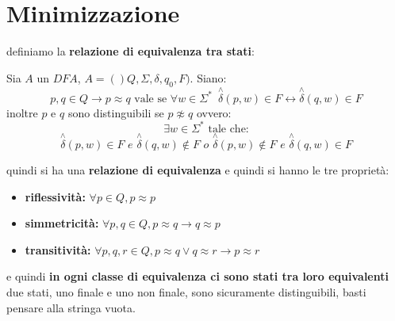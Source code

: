 \section{Minimizzazione}
definiamo la \textbf{relazione di equivalenza tra stati}:
\begin{definition}
	Sia $A$ un $DFA$, $A=()Q,\Sigma,\delta,q_0,F)$. Siano:
	$$p,q\in Q\to p\approx q\mbox{ vale se } \forall w \in \Sigma^*\,\,\, \stackrel{\wedge}{\delta}(p,w)\in F\longleftrightarrow \stackrel{\wedge}{\delta}(q,w)\in F$$
	inoltre $p$ e $q$ sono distinguibili se $p\not\approx q$ ovvero:
	$$\exists w\in \Sigma^*\mbox{ tale che:} $$
	$$\stackrel{\wedge}{\delta}(p,w)\in F \,\,e\,\,\stackrel{\wedge}{\delta}(q,w)\not\in F\,\,o\,\,\stackrel{\wedge}{\delta}(p,w)\not\in F \,\,e\,\,\stackrel{\wedge}{\delta}(q,w)\in F$$
\end{definition}
quindi si ha una \textbf{relazione di equivalenza} e quindi si hanno le tre proprietà:
\begin{itemize}
	\item \textbf{riflessività:} $\forall p\in Q, p\approx p$
	\item \textbf{simmetricità:} $\forall p,q\in Q, p\approx q\to q\approx p$
	\item \textbf{transitività:} $\forall p,q,r\in Q, p\approx q\vee q\approx r\to p\approx r$
\end{itemize}
e quindi \textbf{in ogni classe di equivalenza ci sono stati tra loro equivalenti}
due stati, uno finale e uno non finale, sono sicuramente distinguibili, basti pensare alla stringa vuota.
